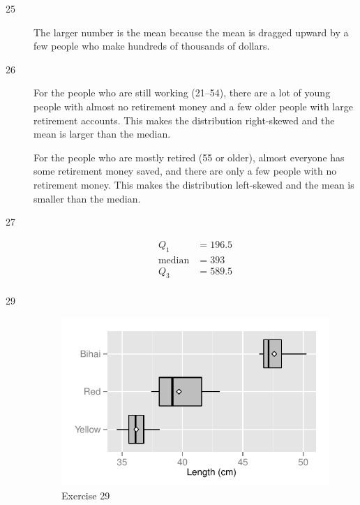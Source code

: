 \documentclass[letterpaper, landscape]{exam}
\begin{document}
    \begin{description}
      \item[25] The larger number is the mean because the mean is dragged upward by a few
        people who make hundreds of thousands of dollars.

      \item[26] 
        For the people who are still working (21--54), there are a lot of young people with
        almost no retirement money and a few older people with large retirement accounts.
        This makes the distribution right-skewed and the mean is larger than the median.

        For the people who are mostly retired (55 or older), almost everyone has some
        retirement money saved, and there are only a few people with no retirement money.
        This makes the distribution left-skewed and the mean is smaller than the median.

      \item[27] 
        \begin{align*}
          Q_1           & = 196.5 \\
          \text{median} & = 393 \\
          Q_3           & = 589.5 \\
        \end{align*}

      \item[29]
        \begin{figure}[H]
          \centering
          \includegraphics{figures/ex29.pdf}
          \caption{Exercise 29}
        \end{figure}


\end{description}
\end{document}
